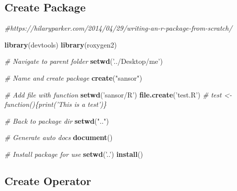 \documentclass[]{book}
\newenvironment{Shaded}{\begin{snugshade}}{\end{snugshade}}
\newcommand{\KeywordTok}[1]{\textcolor[rgb]{0.13,0.29,0.53}{\textbf{#1}}}
\newcommand{\DataTypeTok}[1]{\textcolor[rgb]{0.13,0.29,0.53}{#1}}
\newcommand{\DecValTok}[1]{\textcolor[rgb]{0.00,0.00,0.81}{#1}}
\newcommand{\StringTok}[1]{\textcolor[rgb]{0.31,0.60,0.02}{#1}}
\newcommand{\CommentTok}[1]{\textcolor[rgb]{0.56,0.35,0.01}{\textit{#1}}}
\newcommand{\ControlFlowTok}[1]{\textcolor[rgb]{0.13,0.29,0.53}{\textbf{#1}}}
\newcommand{\OperatorTok}[1]{\textcolor[rgb]{0.81,0.36,0.00}{\textbf{#1}}}
\newcommand{\NormalTok}[1]{#1}
\theoremstyle{definition}
\theoremstyle{definition}
\theoremstyle{definition}
\theoremstyle{remark}
\begin{document}
\subsection{Create Package}\label{create-package}

\begin{Shaded}
\begin{Highlighting}[]
\CommentTok{#https://hilaryparker.com/2014/04/29/writing-an-r-package-from-scratch/}

\KeywordTok{library}\NormalTok{(devtools)}
\KeywordTok{library}\NormalTok{(roxygen2)}

\CommentTok{# Navigate to parent folder}
\KeywordTok{setwd}\NormalTok{(}\StringTok{'../Desktop/me'}\NormalTok{)}

\CommentTok{# Name and create package}
\KeywordTok{create}\NormalTok{(}\StringTok{"sansor"}\NormalTok{)}

\CommentTok{# Add file with function}
\KeywordTok{setwd}\NormalTok{(}\StringTok{'sansor/R'}\NormalTok{)}
\KeywordTok{file.create}\NormalTok{(}\StringTok{'test.R'}\NormalTok{) }\CommentTok{# test <- function()\{print('This is a test')\}}

\CommentTok{# Back to package dir}
\KeywordTok{setwd}\NormalTok{(}\StringTok{".."}\NormalTok{)}

\CommentTok{# Generate auto docs}
\KeywordTok{document}\NormalTok{()}

\CommentTok{# Install package for use}
\KeywordTok{setwd}\NormalTok{(}\StringTok{'..'}\NormalTok{)}
\KeywordTok{install}\NormalTok{()}
\end{Highlighting}
\end{Shaded}

\subsection{Create Operator}\label{create-operator}

\begin{Shaded}
\end{Shaded}
\end{document}
